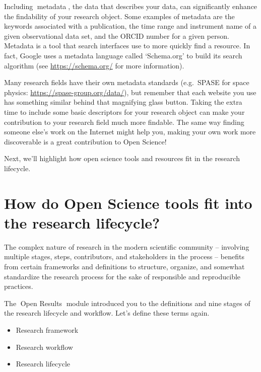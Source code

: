 \documentclass[
  letterpaper,
  DIV=11,
  numbers=noendperiod]{scrreport}
\providecommand{\tightlist}{%
  \setlength{\itemsep}{0pt}\setlength{\parskip}{0pt}}\usepackage{longtable,booktabs,array}
\begin{document}
Including {📖}metadata{📖}, the data that describes your data, can
significantly enhance the findability of your research object. Some
examples of metadata are the keywords associated with a publication, the
time range and instrument name of a given observational data set, and
the ORCID number for a given person. Metadata is a tool that search
interfaces use to more quickly find a resource. In fact, Google uses a
metadata language called `Schema.org' to build its search algorithm (see
\url{https://schema.org/} for more information).

Many research fields have their own metadata standards (e.g.~SPASE for
space physics: \url{https://spase-group.org/data/}), but remember that
each website you use has something similar behind that magnifying glass
button. Taking the extra time to include some basic descriptors for your
research object can make your contribution to your research field much
more findable. The same way finding someone else's work on the Internet
might help you, making your own work more discoverable is a great
contribution to Open Science!

Next, we'll highlight how open science tools and resources fit in the
research lifecycle.

\hypertarget{how-do-open-science-tools-fit-into-the-research-lifecycle}{%
\section*{How do Open Science tools fit into the research
lifecycle?}\label{how-do-open-science-tools-fit-into-the-research-lifecycle}}


The complex nature of research in the modern scientific community --
involving multiple stages, steps, contributors, and stakeholders in the
process -- benefits from certain frameworks and definitions to
structure, organize, and somewhat standardize the research process for
the sake of responsible and reproducible practices.

The 🔗Open Results🔗 module introduced you to the definitions and nine
stages of the research lifecycle and workflow. Let's define these terms
again.

\begin{itemize}
\tightlist
\item
  Research framework
\item
  Research workflow
\item
  Research lifecycle
\end{itemize}
\end{document}
